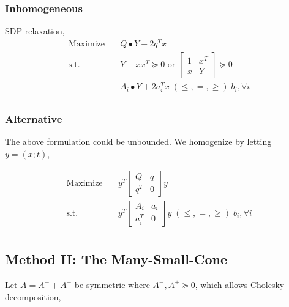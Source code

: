 \documentclass[../main]{subfiles}
\begin{document}
\subsubsection{Inhomogeneous}
SDP relaxation,
\begin{equation}
  \begin{aligned}
    \mathrm{Maximize}\quad & Q\bullet Y   + 2q^T x                                            \\
    \mathrm{s.t.}  \quad   & Y-xx^T \succeq 0 \text { or }\begin{bmatrix} 1 & x^{T} \\ x & Y \end{bmatrix} \succeq 0 \\
                           & A_i \bullet Y +2 a_i^Tx \; (\le, =, \ge) \; b_i, \forall i       \\
  \end{aligned}
\end{equation}

\subsubsection*{Alternative}
The above formulation could be unbounded. We homogenize by letting \(y = (x; t)\),

\begin{equation}
  \begin{aligned}
    \mathrm{Maximize}\quad & y^T
    \begin{bmatrix} Q   & q \\ q^T & 0 \end{bmatrix}y                                                                    \\
    \mathrm{s.t.} \quad    & y^T  \begin{bmatrix} A_i   & a_i \\ a_i^T & 0 \end{bmatrix}y  \; (\le, =, \ge) \; b_i, \forall i \\
  \end{aligned}
\end{equation}



\subsection{Method II: The Many-Small-Cone}\label{sdp-method-2}
Let \(A = A^+ + A^-\) be symmetric where \(A^-, A^+ \succeq 0\), which allows Cholesky decomposition,
\end{document}
